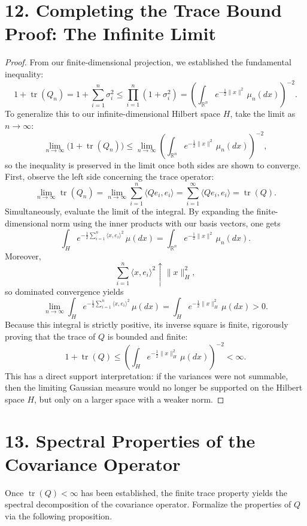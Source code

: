 \documentclass[11pt]{article}
\theoremstyle{definition}
\theoremstyle{remark}
\DeclareMathOperator{\tr}{tr}
\begin{document}
\section*{12. Completing the Trace Bound Proof: The Infinite Limit}
\begin{proof}
From our finite-dimensional projection, we established the fundamental inequality:
\[
1+\tr(Q_n)
=
1+\sum_{i=1}^n \sigma_i^2
\le
\prod_{i=1}^n (1+\sigma_i^2)
=
\left(\int_{\mathbb R^n} e^{-\frac{1}{2}\|x\|^2}\,\mu_n(dx)\right)^{-2}.
\]
To generalize this to our infinite-dimensional Hilbert space $H$, take the limit as \(n\to\infty\):
\[
\lim_{n\to\infty}\bigl(1+\tr(Q_n)\bigr)
\le
\lim_{n\to\infty}\left(\int_{\mathbb R^n} e^{-\frac{1}{2}\|x\|^2}\,\mu_n(dx)\right)^{-2},
\]
so the inequality is preserved in the limit once both sides are shown to converge.
First, observe the left side concerning the trace operator:
\[
\lim_{n\to\infty}\tr(Q_n)
=
\lim_{n\to\infty}\sum_{i=1}^n \langle Qe_i,e_i\rangle
=
\sum_{i=1}^\infty \langle Qe_i,e_i\rangle
=
\tr(Q).
\]
Simultaneously, evaluate the limit of the integral. By expanding the finite-dimensional norm using the inner products with our basis vectors, one gets
\[
\int_H e^{-\frac{1}{2}\sum_{i=1}^n \langle x,e_i\rangle^2}\,\mu(dx)
=
\int_{\mathbb R^n} e^{-\frac{1}{2}\|x\|^2}\,\mu_n(dx).
\]
Moreover,
\[
\sum_{i=1}^n \langle x,e_i\rangle^2 \uparrow \|x\|_H^2,
\]
so dominated convergence yields
\[
\lim_{n\to\infty}\int_H e^{-\frac{1}{2}\sum_{i=1}^n \langle x,e_i\rangle^2}\,\mu(dx)
=
\int_H e^{-\frac{1}{2}\|x\|_H^2}\,\mu(dx)>0.
\]
Because this integral is strictly positive, its inverse square is finite, rigorously proving that the trace of $Q$ is bounded and finite:
\[
1+\tr(Q)\le \left(\int_H e^{-\frac{1}{2}\|x\|_H^2}\,\mu(dx)\right)^{-2}<\infty.
\]
This has a direct support interpretation: if the variances were not summable, then the limiting Gaussian measure would no longer be supported on the Hilbert space \(H\), but only on a larger space with a weaker norm.
\end{proof}

\section*{13. Spectral Properties of the Covariance Operator}
Once \(\tr(Q)<\infty\) has been established, the finite trace property yields the spectral decomposition of the covariance operator. Formalize the properties of $Q$ via the following proposition.
\end{document}

